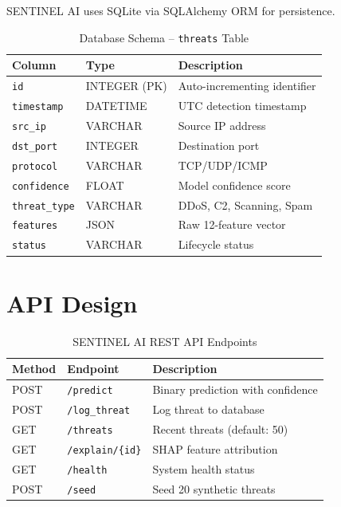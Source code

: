 SENTINEL AI uses SQLite via SQLAlchemy ORM for persistence.

\begin{table}[H]
\centering
\caption{Database Schema -- \texttt{threats} Table}
\label{tab:db_schema}
\begin{tabular}{l l p{5.5cm}}
\toprule
\textbf{Column} & \textbf{Type} & \textbf{Description} \\
\midrule
\texttt{id} & INTEGER (PK) & Auto-incrementing identifier \\
\texttt{timestamp} & DATETIME & UTC detection timestamp \\
\texttt{src\_ip} & VARCHAR & Source IP address \\
\texttt{dst\_port} & INTEGER & Destination port \\
\texttt{protocol} & VARCHAR & TCP/UDP/ICMP \\
\texttt{confidence} & FLOAT & Model confidence score \\
\texttt{threat\_type} & VARCHAR & DDoS, C2, Scanning, Spam \\
\texttt{features} & JSON & Raw 12-feature vector \\
\texttt{status} & VARCHAR & Lifecycle status \\
\bottomrule
\end{tabular}
\end{table}

\section{API Design}

\begin{table}[H]
\centering
\caption{SENTINEL AI REST API Endpoints}
\label{tab:api_endpoints}
\begin{tabular}{l l p{6.5cm}}
\toprule
\textbf{Method} & \textbf{Endpoint} & \textbf{Description} \\
\midrule
POST & \texttt{/predict} & Binary prediction with confidence \\
POST & \texttt{/log\_threat} & Log threat to database \\
GET & \texttt{/threats} & Recent threats (default: 50) \\
GET & \texttt{/explain/\{id\}} & SHAP feature attribution \\
GET & \texttt{/health} & System health status \\
POST & \texttt{/seed} & Seed 20 synthetic threats \\
\bottomrule
\end{tabular}
\end{table}

